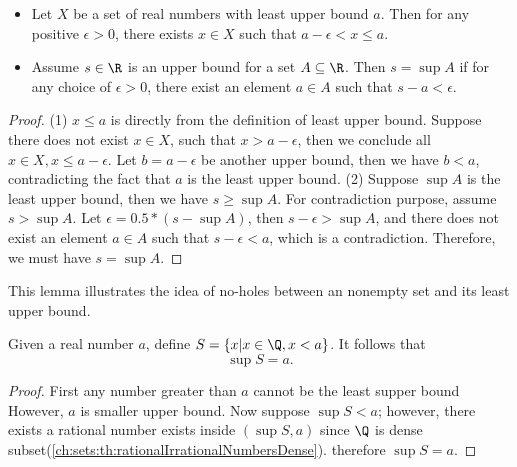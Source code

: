 \begin{refsection}
\begin{lemma} \label{ch:sets:th:leastupperboundisTight}\cite[17]{johnsonbaugh2010foundations}\cite[17]{abbott2001understanding}\hfill
\begin{itemize}
	\item Let $X$ be a set of real numbers with least upper bound $a$. Then for any positive $\epsilon > 0$, there exists $x\in X$ such that $a-\epsilon<x\leq a.$
	\item Assume $s\in \R$ is an upper bound for a set $A\subseteq \R$. Then $s=\sup A$ if for any choice of $\epsilon > 0$, there exist an element $a\in A$ such that $s-a < \epsilon$.
\end{itemize}	
\end{lemma}
\begin{proof}
(1)	
$x\leq a$ is directly from the definition of least upper bound. Suppose there does not exist $x\in X$, such that $x > a-\epsilon$, then we conclude all $x\in X, x \leq a-\epsilon$. Let $b= a - \epsilon$ be another upper bound, then we have $b < a$, contradicting the fact that $a$ is the least upper bound.	
(2) Suppose $\sup A$ is the least upper bound, then we have $s\geq \sup A$. For contradiction purpose, assume $s > \sup A$. Let $\epsilon = 0.5*(s-\sup A)$, then $s-\epsilon > \sup A$, and there does not exist an element  $a\in A$ such that $s-\epsilon < a$, which is a contradiction.  Therefore, we must have $s = \sup A$.

\end{proof}

\begin{remark}
This lemma illustrates the idea of no-holes between an nonempty set and its least upper bound.
\end{remark}



\begin{lemma}
Given a real number $a$, define $S = \{x|x\in \Q, x < a\}$. It follows that
$$\sup S = a.$$	
\end{lemma}
\begin{proof}
First any number greater than $a$ cannot be the least supper bound However, $a$ is smaller upper bound. Now suppose $\sup S < a$; however, there exists a rational number exists inside $(\sup S,a)$ since $\Q$ is dense subset(\autoref{ch:sets:th:rationalIrrationalNumbersDense}). therefore $\sup S = a$.
\end{proof}




\end{refsection}
